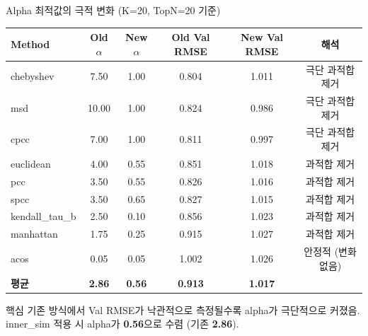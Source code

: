 \documentclass[aspectratio=169,10pt]{beamer}
\begin{document}
\begin{frame}[shrink=30]{Alpha 최적값의 극적 변화 (K=20, TopN=20 기준)}
	\begin{center}
	\renewcommand{\arraystretch}{1.25}
	\begin{tabular}{l|c|c|c|c|c}
		\toprule
		\textbf{Method} & \textbf{Old $\alpha$} & \textbf{New $\alpha$} & \textbf{Old Val RMSE} & \textbf{New Val RMSE} & \textbf{해석} \\
		\midrule
		chebyshev    & \textcolor{negred}{7.50} & 1.00 & \textcolor{negred}{0.804} & 1.011 & 극단 과적합 제거 \\
		msd          & \textcolor{negred}{10.00}& 1.00 & \textcolor{negred}{0.824} & 0.986 & 극단 과적합 제거 \\
		cpcc         & \textcolor{negred}{7.00} & 1.00 & \textcolor{negred}{0.811} & 0.997 & 극단 과적합 제거 \\
		euclidean    & \textcolor{negred}{4.00} & 0.55 & \textcolor{negred}{0.851} & 1.018 & 과적합 제거 \\
		pcc          & \textcolor{negred}{3.50} & 0.55 & \textcolor{negred}{0.826} & 1.016 & 과적합 제거 \\
		spcc         & \textcolor{negred}{3.50} & 0.65 & \textcolor{negred}{0.827} & 1.015 & 과적합 제거 \\
		kendall\_tau\_b& \textcolor{negred}{2.50}& 0.10 & \textcolor{negred}{0.856} & 1.023 & 과적합 제거 \\
		manhattan    & \textcolor{negred}{1.75} & 0.25 & \textcolor{negred}{0.915} & 1.027 & 과적합 제거 \\
		acos         & 0.05 & 0.05 & 1.002 & 1.026 & 안정적 (변화 없음) \\
		\midrule
		\textbf{평균}& \textbf{2.86} & \textbf{0.56} & \textbf{0.913} & \textbf{1.017} & \\
		\bottomrule
	\end{tabular}
	\end{center}

	\vspace{0.3em}
	\begin{alertblock}{핵심}
		기존 방식에서 Val RMSE가 낙관적으로 측정될수록 alpha가 극단적으로 커졌음.
		inner\_sim 적용 시 alpha가 \textbf{0.56}으로 수렴 (기존 \textbf{2.86}).
	\end{alertblock}
\end{frame}
\end{document}
